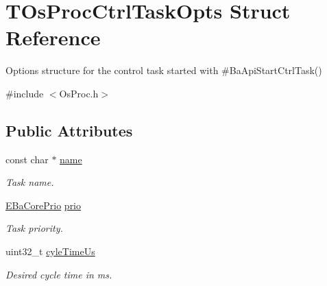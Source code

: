 \hypertarget{structTOsProcCtrlTaskOpts}{}\section{T\+Os\+Proc\+Ctrl\+Task\+Opts Struct Reference}
\label{structTOsProcCtrlTaskOpts}


Options structure for the control task started with \#\+Ba\+Api\+Start\+Ctrl\+Task()  




{\ttfamily \#include $<$Os\+Proc.\+h$>$}

\subsection*{Public Attributes}
\begin{DoxyCompactItemize}
\item 
\mbox{\label{structTOsProcCtrlTaskOpts_a4ca14d44ee20af9f8e34aa0c50ef4ef2}} 
const char $\ast$ \hyperlink{structTOsProcCtrlTaskOpts_a4ca14d44ee20af9f8e34aa0c50ef4ef2}{name}
\begin{DoxyCompactList}\small\item\em Task name. \end{DoxyCompactList}\item 
\mbox{\label{structTOsProcCtrlTaskOpts_a1e7c435cfa5d0f275855f7fb403ec0e1}} 
\hyperlink{BaCore_8h_a2021b3f630464ad65ce8f08ab10dc910}{E\+Ba\+Core\+Prio} \hyperlink{structTOsProcCtrlTaskOpts_a1e7c435cfa5d0f275855f7fb403ec0e1}{prio}
\begin{DoxyCompactList}\small\item\em Task priority. \end{DoxyCompactList}\item 
\mbox{\label{structTOsProcCtrlTaskOpts_aecdcb6fe934bdf0c8333a7cf69d771e8}} 
uint32\+\_\+t \hyperlink{structTOsProcCtrlTaskOpts_aecdcb6fe934bdf0c8333a7cf69d771e8}{cyle\+Time\+Us}
\begin{DoxyCompactList}\small\item\em Desired cycle time in ms. \end{DoxyCompactList}\item 
\mbox{\label{structTOsProcCtrlTaskOpts_a6e6097af89a05b7fbf2deb6ea2a09efe}} 

\end{DoxyCompactItemize}
